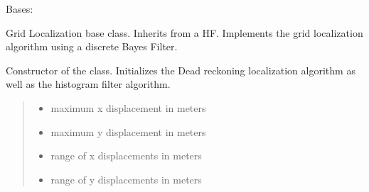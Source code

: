 \documentclass[letterpaper,10pt,english]{sphinxmanual}
\begin{document}
\begin{fulllineitems}
\label{\detokenize{GridLocalization:GL.GL}}
\pysigstartsignatures
{}
\pysigstopsignatures
\sphinxAtStartPar
Bases: {\hyperref[\detokenize{HF:HF.HF}]{}}

\sphinxAtStartPar
Grid Localization base class. Inherits from a HF. Implements the grid localization algorithm using a discrete Bayes Filter.

\begin{fulllineitems}
\label{\detokenize{GridLocalization:GL.GL.__init__}}
\pysigstartsignatures
{}
\pysigstopsignatures
\sphinxAtStartPar
Constructor of the {\hyperref[\detokenize{GridLocalization:GL.GL}]{}} class. Initializes the Dead reckoning localization algorithm as well as the histogram filter algorithm.
\begin{quote}\begin{description}
\begin{itemize}
\item {} 
\sphinxAtStartPar
{} \textendash{} maximum x displacement in meters

\item {} 
\sphinxAtStartPar
{} \textendash{} maximum y displacement in meters

\item {} 
\sphinxAtStartPar
{} \textendash{} range of x displacements in meters

\item {} 
\sphinxAtStartPar
{} \textendash{} range of y displacements in meters


\end{itemize}
\end{description}
\end{quote}
\end{fulllineitems}
\end{fulllineitems}
\end{document}
